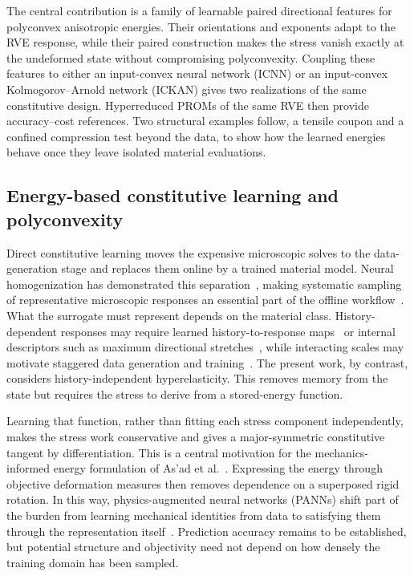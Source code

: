The central contribution is a family of learnable paired directional features for polyconvex anisotropic energies. Their orientations and exponents adapt to the RVE response, while their paired construction makes the stress vanish exactly at the undeformed state without compromising polyconvexity. Coupling these features to either an input-convex neural network (ICNN) or an input-convex Kolmogorov--Arnold network (ICKAN) gives two realizations of the same constitutive design. Hyperreduced PROMs of the same RVE then provide accuracy--cost references. Two structural examples follow, a tensile coupon and a confined compression test beyond the data, to show how the learned energies behave once they leave isolated material evaluations.

\subsection{Energy-based constitutive learning and polyconvexity}
Direct constitutive learning moves the expensive microscopic solves to the data-generation stage and replaces them online by a trained material model. Neural homogenization has demonstrated this separation~\cite{Aldakheel2023}, making systematic sampling of representative microscopic responses an essential part of the offline workflow~\cite{kalina2023}. What the surrogate must represent depends on the material class. History-dependent responses may require learned history-to-response maps~\cite{Liu2022} or internal descriptors such as maximum directional stretches~\cite{Ghaderi2020}, while interacting scales may motivate staggered data generation and training~\cite{AsadFarhat2026}. The present work, by contrast, considers history-independent hyperelasticity. This removes memory from the state but requires the stress to derive from a stored-energy function.

Learning that function, rather than fitting each stress component independently, makes the stress work conservative and gives a major-symmetric constitutive tangent by differentiation. This is a central motivation for the mechanics-informed energy formulation of As'ad et al.~\cite{asad2022}. Expressing the energy through objective deformation measures then removes dependence on a superposed rigid rotation. In this way, physics-augmented neural networks (PANNs) shift part of the burden from learning mechanical identities from data to satisfying them through the representation itself~\cite{klein2022,linden2023}. Prediction accuracy remains to be established, but potential structure and objectivity need not depend on how densely the training domain has been sampled.

